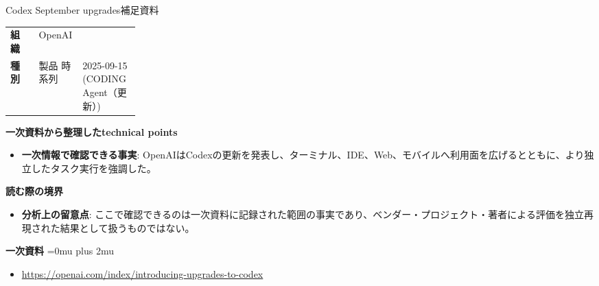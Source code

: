\begin{technicalnote}{Codex September upgrades}{補足資料}
\begingroup
\begin{tabularx}{\linewidth}{@{}>{\bfseries}p{0.22\linewidth}X@{}}
組織 & OpenAI \\
種別 & 製品
時系列 & 2025-09-15 (CODING Agent（更新）) \\
\end{tabularx}
\smallskip
{\bfseries 一次資料から整理したtechnical points}
\begin{itemize}[leftmargin=1.5em,itemsep=0.35em]
\item \textbf{一次情報で確認できる事実}: OpenAIはCodexの更新を発表し、ターミナル、IDE、Web、モバイルへ利用面を広げるとともに、より独立したタスク実行を強調した。
\end{itemize}
\begin{minipage}{\linewidth}
{\bfseries 読む際の境界}
\begin{itemize}[leftmargin=1.5em,itemsep=0.35em]
\item \textbf{分析上の留意点}: ここで確認できるのは一次資料に記録された範囲の事実であり、ベンダー・プロジェクト・著者による評価を独立再現された結果として扱うものではない。
\end{itemize}
\begin{samepage}
{\bfseries 一次資料}
\begingroup\sloppy
\Urlmuskip=0mu plus 2mu\relax
\begin{itemize}[leftmargin=1.5em,itemsep=0.25em]
\item {\scriptsize\url{https://openai.com/index/introducing-upgrades-to-codex}}
\end{itemize}
\endgroup
\end{samepage}
\end{minipage}
\endgroup
\end{technicalnote}
\medskip
